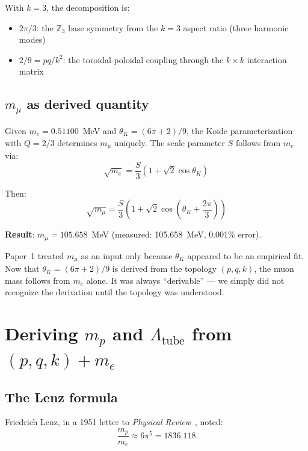 \documentclass[11pt,a4paper]{article}
\begin{document}
With $k = 3$, the decomposition is:
\begin{itemize}
  \item $2\pi/3$: the $\mathbb{Z}_3$ base symmetry from the $k=3$ aspect ratio (three harmonic modes)
  \item $2/9 = pq/k^2$: the toroidal-poloidal coupling through the $k \times k$ interaction matrix
\end{itemize}

\subsection{$m_\mu$ as derived quantity}

Given $m_e = 0.51100$~MeV and $\theta_K = (6\pi+2)/9$, the Koide parameterization with $Q = 2/3$ determines $m_\mu$ uniquely. The scale parameter $S$ follows from $m_e$ via:
\begin{equation}
  \sqrt{m_e} = \frac{S}{3}\!\left(1 + \sqrt{2}\cos\theta_K\right)
\end{equation}

Then:
\begin{equation}
  \sqrt{m_\mu} = \frac{S}{3}\!\left(1 + \sqrt{2}\cos\!\left(\theta_K + \frac{2\pi}{3}\right)\right)
\end{equation}

\textbf{Result}: $m_\mu = 105.658$~MeV (measured: 105.658~MeV, 0.001\% error).

Paper~1 treated $m_\mu$ as an input only because $\theta_K$ appeared to be an empirical fit. Now that $\theta_K = (6\pi+2)/9$ is derived from the topology $(p, q, k)$, the muon mass follows from $m_e$ alone. It was always ``derivable'' --- we simply did not recognize the derivation until the topology was understood.

\section{Deriving $m_p$ and $\Lambda_{\text{tube}}$ from $(p, q, k) + m_e$}
\label{sec:proton}

\subsection{The Lenz formula}

Friedrich Lenz, in a 1951 letter to \emph{Physical Review}~\cite{lenz1951}, noted:
\begin{equation}
  \frac{m_p}{m_e} \approx 6\pi^5 = 1836.118
  \label{eq:lenz}
\end{equation}
\end{document}
